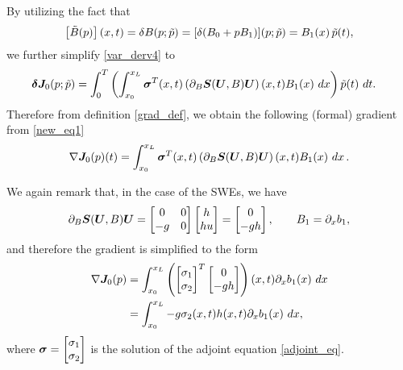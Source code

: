 By utilizing the fact that
\begin{equation} \label{tB}
    \left[{\tilde{B}}(p)\right] (x,t)= \delta B ( p ; \tilde p ) = [ \delta ( B_0 + p B_1 )  ] ( p ; \tilde p )  =  B_1(x) \, \tilde{p}(t) ,
\end{equation}
we further simplify \eqref{var_derv4} to
\begin{equation}
\begin{split}
\label{new_eq1}
      \dJ_0(p;\tp) & =  \int_0^T \left(\int_{x_0}^{x_L}  \sig^T(x,t) \left(\partial_{B}\bS(\U,B)\U\right) (x,t) B_1(x) \ dx\right) \tp(t) \ dt.
\end{split}
\end{equation}
Therefore from definition \eqref{grad_def}, we obtain the following (formal) gradient from \eqref{new_eq1}
\begin{equation} \label{gradient2}
    \nabla \bm{J}_0(p)(t) 
    = \int_{x_0}^{x_L} \bm{\sigma}^T(x,t) \left(\partial_{B}\bm{S}(\bm{U},B)\bm{U}\right) (x,t) B_1(x) \ dx \,.
\end{equation}

We again remark that, in the case of the SWEs, we have
\begin{equation}
    \partial_{B}\bm{S}(\bm{U},B)\bm{U} = \begin{bmatrix}0 & 0 \\ -g & 0\end{bmatrix}\begin{bmatrix}h \\ hu\end{bmatrix} = \begin{bmatrix}0 \\-gh \end{bmatrix}, 
    \qquad B_1 = \partial_x b_1,
\end{equation}
and therefore the gradient is simplified to the form
\begin{equation}
\begin{split}
    \nabla \J_0 (p) 
    & = \int_{x_0}^{x_L} \left(\begin{bmatrix} \sigma_1 \\ \sigma_2 \end{bmatrix}^T \begin{bmatrix}0 \\ -gh\end{bmatrix}\right)(x,t)\partial_x b_1(x)\ dx \\
    & = \int_{x_0}^{x_L} -g \sigma_2(x,t) h(x,t) \partial_x b_1(x) \ dx,
\end{split}
\end{equation}
where $\bm{\sigma} = \begin{bmatrix} \sigma_1 \\ \sigma_2 \end{bmatrix}$ is the solution of the adjoint equation \eqref{adjoint_eq}.


